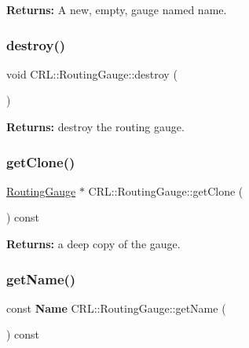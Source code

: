 {\bfseries Returns\+:} A new, empty, gauge named {\ttfamily name}. \mbox{\label{classCRL_1_1RoutingGauge_a4726a734f9aff09873c4034e5169a93a}} 
\subsubsection{\texorpdfstring{destroy()}{destroy()}}
{\footnotesize\ttfamily void C\+R\+L\+::\+Routing\+Gauge\+::destroy (\begin{DoxyParamCaption}{ }\end{DoxyParamCaption})\hspace{0.3cm}{\ttfamily [virtual]}}

{\bfseries Returns\+:} destroy the routing gauge. \mbox{\label{classCRL_1_1RoutingGauge_a210f2ca35bdb8c8e0ccb3a671659554e}} 
\subsubsection{\texorpdfstring{get\+Clone()}{getClone()}}
{\footnotesize\ttfamily \hyperlink{classCRL_1_1RoutingGauge}{Routing\+Gauge} $\ast$ C\+R\+L\+::\+Routing\+Gauge\+::get\+Clone (\begin{DoxyParamCaption}{ }\end{DoxyParamCaption}) const}

{\bfseries Returns\+:} a deep copy of the gauge. \mbox{\label{classCRL_1_1RoutingGauge_a9a8eb201ffaca26bb563f7a34846c0c4}} 
\subsubsection{\texorpdfstring{get\+Name()}{getName()}}
{\footnotesize\ttfamily const \textbf{ Name} C\+R\+L\+::\+Routing\+Gauge\+::get\+Name (\begin{DoxyParamCaption}{ }\end{DoxyParamCaption}) const\hspace{0.3cm}{\ttfamily [inline]}}


